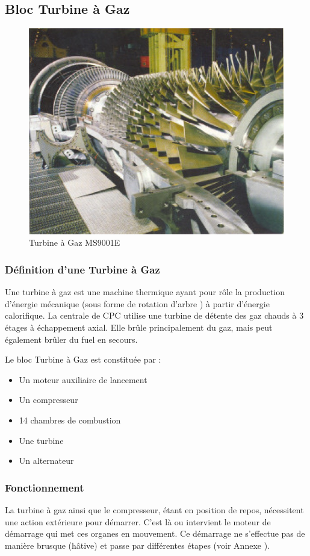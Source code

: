 \subsection{Bloc Turbine à Gaz}
\begin{figure}[hbtp]
\centering
\includegraphics[scale=1]{./Figures/tg.jpg}
\caption{Turbine à Gaz MS9001E}
\end{figure}
\subsubsection{Définition d'une Turbine à Gaz }
Une turbine à gaz est une machine thermique ayant pour rôle la production d'énergie mécanique (sous forme de rotation d'arbre ) à partir d'énergie calorifique. La centrale de CPC utilise une turbine de détente des gaz chauds à 3 étages à échappement axial. Elle brûle principalement du gaz, mais peut également brûler du fuel en secours.

Le bloc Turbine à Gaz est constituée par :

\begin{itemize}
\item Un moteur auxiliaire de lancement
\item Un compresseur
\item 14 chambres de combustion
\item Une turbine
\item Un alternateur
\end{itemize}


\subsubsection{Fonctionnement}
La turbine à gaz ainsi que le compresseur, étant en position de repos, nécessitent une action extérieure pour démarrer.
C'est là ou intervient le moteur de démarrage qui met ces organes en mouvement.
Ce démarrage ne s'effectue pas de manière brusque (hâtive) et passe par différentes étapes (voir Annexe \uppercase\expandafter{}).
   

